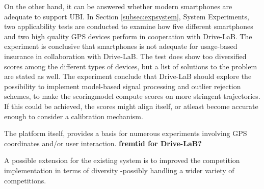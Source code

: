 On the other hand, it can be answered whether modern smartphones are adequate to support UBI. In Section \ref{subsec:expsystem}, System Experiments, two applicability tests are conducted to examine how five different smartphones and two high quality GPS devices perform in cooperation with Drive-LaB. The experiment is conclusive that smartphones is not adequate for usage-based insurance in collaboration with Drive-LaB. The test does show too diversified scores among the different types of devices, but a list of solutions to the problem are stated as well. The experiment conclude that Drive-LaB should explore the possibility to implement model-based signal processing and outlier rejection schemes, to make the scoringmodel compute scores on more stringent trajectories. If this could be achieved, the scores might align itself, or atleast become accurate enough to consider a calibration mechanism.

The platform itself, provides a basis for numerous experiments involving GPS coordinates and/or user interaction. \textbf{fremtid for Drive-LaB?}

A possible extension for the existing system is to improved the competition implementation in terms of diversity -possibly handling a wider variety of competitions.


\addtolength{\textheight}{-12cm}   %
